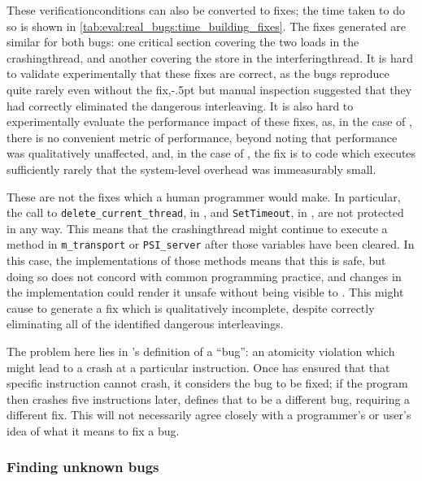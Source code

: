 \noindent
These \glspl{verificationcondition} can also be converted to fixes;
the time taken to do so is shown in
\autoref{tab:eval:real_bugs:time_building_fixes}.  The fixes generated
are similar for both bugs: one critical section covering the two loads
in the \gls{crashingthread}, and another covering the store in the
\gls{interferingthread}.  It is hard to validate experimentally that
these fixes are correct, as the bugs reproduce quite rarely even
without the fix,\kern-.5pt but manual inspection
suggested that they had correctly eliminated the dangerous
interleaving.  It is also hard to experimentally evaluate the
performance impact of these fixes, as, in the case of
, there is no convenient metric of performance,
beyond noting that performance was qualitatively unaffected, and, in
the case of , the fix is to code which executes
sufficiently rarely that the system-level overhead was immeasurably
small.

These are not the fixes which a human programmer would make.  In
particular, the call to \texttt{delete\_current\_thread}, in
, and \texttt{SetTimeout}, in ,
are not protected in any way.  This means that the
\gls{crashingthread} might continue to execute a method in
\texttt{m\_transport} or \texttt{PSI\_server} after those variables
have been cleared.  In this case, the implementations of those methods
means that this is safe, but doing so does not concord with common
programming practice, and changes in the implementation could render
it unsafe without being visible to {\technique}.  This might cause
{\technique} to generate a fix which is qualitatively incomplete,
despite correctly eliminating all of the identified dangerous
interleavings.

The problem here lies in {\technique}'s definition of a ``bug'': an
atomicity violation which might lead to a crash at a particular
instruction.  Once {\implementation} has ensured that that specific
instruction cannot crash, it considers the bug to be fixed; if the
program then crashes five instructions later, {\technique} defines
that to be a different bug, requiring a different fix.  This will not
necessarily agree closely with a programmer's or user's idea of what
it means to fix a bug.

\subsubsection{Finding unknown bugs}
\label{sect:how:finding_unknown}

